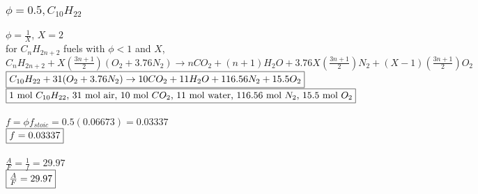 \documentclass{article}
\begin{document}
\subsubsection*{$\phi=0.5, C_{10}H_{22}$}
$\phi=\frac{1}{X}$, $X=2$ \\
for $C_nH_{2n+2}$ fuels with $\phi<1$ and $X$, \\
$C_nH_{2n+2}+X(\frac{3n+1}{2})(O_2+3.76N_2) \rightarrow nCO_2 + (n+1)H_2O +3.76X(\frac{3n+1}{2})N_2 +
(X-1)(\frac{3n+1}{2})O_2$ \\
$\fbox{$C_{10}H_{22}+31(O_2+3.76N_2) \rightarrow 10CO_2+11H_2O+116.56N_2+15.5O_2$}$ \\
$\fbox{1 mol $C_{10}H_{22}$, 31 mol air, 10 mol $CO_2$, 11 mol water, 116.56 mol $N_2$,
15.5 mol $O_2$}$\\\\
$f=\phi f_{stoic}=0.5(0.06673)=0.03337$ \\
$\fbox{$f=0.03337$}$ \\\\
$\frac{A}{F}=\frac{1}{f}=29.97$ \\
$\fbox{$\frac{A}{F}=29.97$}$
\end{document}
